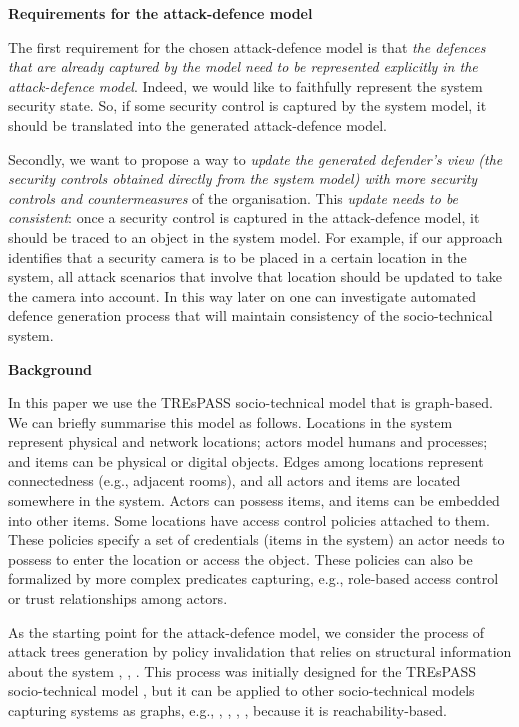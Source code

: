 \documentclass{llncs}
\begin{document}
\textbf{Requirements for the attack-defence model}

The first requirement for the chosen attack-defence model is that \emph{the defences that are already captured by the model need to be represented explicitly in the attack-defence model}. Indeed, we would like to faithfully represent the system security state. So, if some security control is captured by the system model, it should be translated into the generated attack-defence model. 

Secondly, we want to propose a way to \emph{update the generated defender's view (the security controls obtained directly from the system model) with more security controls and countermeasures} of the organisation. This \emph{update needs to be consistent}: once a security control is captured in the attack-defence model, it should be traced to an object in the system model. For example, if our approach identifies that a security camera is to be placed in a certain location in the system, all attack scenarios that involve that location should be updated to take the camera into account. In this way later on one can investigate automated defence generation process that will maintain consistency of the socio-technical system. 



\textbf{Background}

In this paper we use the TREsPASS socio-technical model \cite{D1.3.1} that is graph-based. We can briefly summarise this model as follows. Locations in the system represent physical and network locations; actors model humans and processes; and items can be physical or digital objects. Edges among locations represent connectedness (e.g., adjacent rooms), and all actors and items are located somewhere in the system. Actors can possess items, and items can be embedded into other items. Some locations have access control policies attached to them. These policies specify a set of credentials (items in the system) an actor needs to possess to enter the location or access the object. These policies can also be formalized by more complex predicates capturing, e.g., role-based access control or trust relationships among actors. 

As the starting point for the attack-defence model, we consider the process of attack trees generation by policy invalidation that relies on structural information about the system \cite{Ivanova-Generation-2014}, \cite{D3.4.1-2014}, \cite{Kammuller-2013}. This process was initially designed for the TREsPASS socio-technical model \cite{D1.3.1}, but it can be applied to other socio-technical models capturing systems as graphs, e.g., \cite{Exasym-2008}, \cite{ANKH}, \cite{Portunes-2010}, \cite{Lenzini-2015}, because it is reachability-based.
\end{document}
